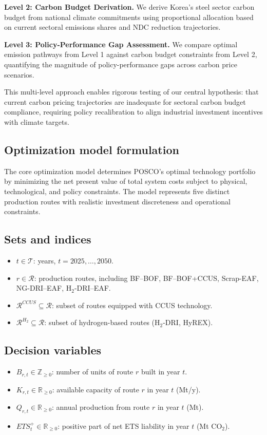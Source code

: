 \documentclass[preprint,1p,authoryear]{elsarticle}
\begin{document}
\textbf{Level 2: Carbon Budget Derivation.} We derive Korea's steel sector carbon budget from national climate commitments using proportional allocation based on current sectoral emissions shares and NDC reduction trajectories.

\textbf{Level 3: Policy-Performance Gap Assessment.} We compare optimal emission pathways from Level 1 against carbon budget constraints from Level 2, quantifying the magnitude of policy-performance gaps across carbon price scenarios.

This multi-level approach enables rigorous testing of our central hypothesis: that current carbon pricing trajectories are inadequate for sectoral carbon budget compliance, requiring policy recalibration to align industrial investment incentives with climate targets.

\subsection{Optimization model formulation}

The core optimization model determines POSCO's optimal technology portfolio by minimizing the net present value of total system costs subject to physical, technological, and policy constraints. The model represents five distinct production routes with realistic investment discreteness and operational constraints.

\subsection{Sets and indices}
\begin{itemize}[leftmargin=*]
    \item $t \in \mathcal{T}$: years, $t = 2025, \dots, 2050$.
    \item $r \in \mathcal{R}$: production routes, including BF--BOF, BF--BOF+CCUS, Scrap-EAF, NG-DRI--EAF, H$_2$-DRI--EAF.
    \item $\mathcal{R}^{CCUS} \subseteq \mathcal{R}$: subset of routes equipped with CCUS technology.
    \item $\mathcal{R}^{H_2} \subseteq \mathcal{R}$: subset of hydrogen-based routes (H$_2$-DRI, HyREX).
\end{itemize}

\subsection{Decision variables}
\begin{itemize}[leftmargin=*]
    \item $B_{r,t} \in \mathbb{Z}_{\ge 0}$: number of units of route $r$ built in year $t$.
    \item $K_{r,t} \in \mathbb{R}_{\ge 0}$: available capacity of route $r$ in year $t$ (Mt/y).
    \item $Q_{r,t} \in \mathbb{R}_{\ge 0}$: annual production from route $r$ in year $t$ (Mt).
    \item $ETS_{t}^{+} \in \mathbb{R}_{\ge 0}$: positive part of net ETS liability in year $t$ (Mt CO$_2$).
\end{itemize}
\end{document}
